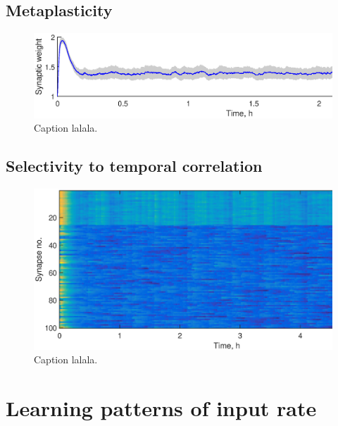 \documentclass[a4paper,12pt]{report}
\theoremstyle{definition}
\begin{document}
\subsection{Metaplasticity}
\begin{figure}[h]
    \includegraphics[width=\textwidth]{figures/valid_metaplasticity_evolution.eps}
    \caption{Caption lalala.}
    \label{fig:valid_metaplasticity_evolution}
\end{figure}





\subsection{Selectivity to temporal correlation} %

\begin{figure}[h]
    \includegraphics[width=\textwidth]{figures/valid_selectivity_correlation.eps}
    \caption{Caption lalala.}
    \label{fig:selectivity_correlation}
\end{figure}









\section{Learning patterns of input rate}
\end{document}
